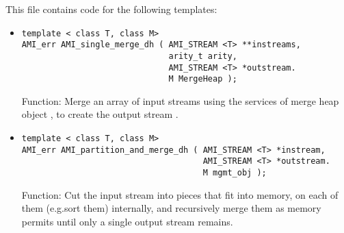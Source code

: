 This file contains code for the following templates:
\begin{itemize}
    
    \item
\begin{verbatim}
template < class T, class M>
AMI_err AMI_single_merge_dh ( AMI_STREAM <T> **instreams,
                              arity_t arity,
                              AMI_STREAM <T> *outstream.
                              M MergeHeap );
\end{verbatim}
    Function: Merge an array  of  input
    streams using the services of merge heap object
    , to create the output stream
    .
    
    \item
\begin{verbatim}
template < class T, class M>
AMI_err AMI_partition_and_merge_dh ( AMI_STREAM <T> *instream,
                                     AMI_STREAM <T> *outstream.
                                     M mgmt_obj );
\end{verbatim}
    Function: Cut the input stream  into pieces that
    fit into memory,  on each of them (e.g.sort
    them) internally, and recursively merge them as memory
    permits until only a single output stream
     remains.
\end{itemize}

